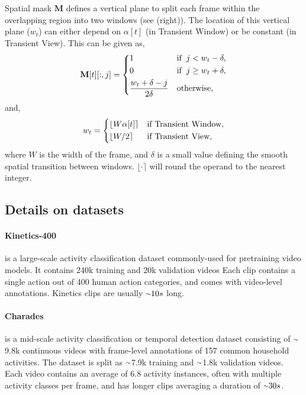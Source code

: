 \documentclass[letterpaper]{article} \usepackage{aaai23}  \usepackage{times}  \usepackage{helvet}  \usepackage{courier}  \usepackage[hyphens]{url}  \usepackage{graphicx} \urlstyle{rm} \def\UrlFont{\rm}  \usepackage{natbib}  \usepackage{caption} \frenchspacing  \setlength{\pdfpagewidth}{8.5in}  \setlength{\pdfpageheight}{11in}  \usepackage{algorithm}
\newcommand{\app}{\raise.17ex\hbox{$\scriptstyle\sim$}}
\newcommand{\round}[1]{\ensuremath{\lfloor#1\rceil}}
\begin{document}
Spatial mask $\mathbf{M}$ defines a vertical plane to split each frame within the overlapping region into two windows (see  (right)). The location of this vertical plane ($w_t$) can either depend on $\alpha[t]$ (in Transient Window) or be constant (in Transient View). This can be given as,
{\small
\begin{equation*}
\label{eq:alpha}
\mathbf{M}[t][:,j]=
\begin{dcases}
1 &\text{if}\;\; j < w_t-\delta,\\
0 &\text{if}\;\; j \geq w_t+\delta ,\\
\frac{w_t+\delta-j}{2\delta} & \text{otherwise},\\
\end{dcases}  
\end{equation*}
}and,
{\small
\begin{equation*}
\label{eq:alpha}
w_t=
\begin{dcases}
\round{W\alpha[t]} &\text{if Transient Window,}\\
\round{W/2} &\text{if Transient View,}\\
\end{dcases}  
\end{equation*}
}where $W$ is the width of the frame, and $\delta$ is a small value defining the smooth spatial transition between windows. $\round{\cdot}$ will round the operand to the nearest integer.

\subsection{Details on datasets}

\paragraph{Kinetics-400} \cite{carreira2017quo} is a large-scale activity classification dataset commonly-used for pretraining video models. It contains 240k training and 20k validation videos
Each clip contains a single action out of 400 human action categories, and comes with video-level annotations. Kinetics clips are usually $\app10s$ long.

\paragraph{Charades} \cite{sigurdsson2016hollywood} is a mid-scale activity classification or temporal detection dataset consisting of $\app$9.8k continuous videos with frame-level annotations of 157 common household activities. The dataset is split as $\app$7.9k training and $\app$1.8k validation videos. Each video contains an average of 6.8 activity instances, often with multiple activity classes per frame, and has longer clips averaging a duration of $\app30s$.
\end{document}
